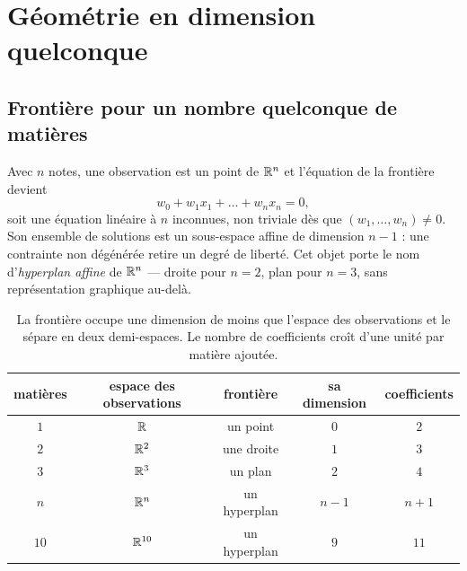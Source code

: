 \chapter{Géométrie en dimension quelconque}
\label{ann:geometrie}


\section{Frontière pour un nombre quelconque de matières}

Avec $n$ notes, une observation est un point de $\mathbb{R}^n$ et l'équation de la
frontière devient
\[
  w_0+w_1x_1+\dots+w_nx_n=0,
\]
soit une équation linéaire à $n$ inconnues, non triviale dès que
$(w_1,\dots,w_n)\neq0$. Son ensemble de solutions est un sous-espace affine de
dimension $n-1$ : une contrainte non dégénérée retire un degré de liberté. Cet
objet porte le nom d'\emph{hyperplan affine} de $\mathbb{R}^n$ --- droite pour $n=2$,
plan pour $n=3$, sans représentation graphique au-delà.

\begin{table}[htbp]
\centering
\begin{tabular}{ccccc}
\toprule
matières & espace des observations & frontière & sa dimension & coefficients \\
\midrule
$1$  & $\mathbb{R}$      & un point    & $0$ & $2$  \\
$2$  & $\mathbb{R}^2$    & une droite  & $1$ & $3$  \\
$3$  & $\mathbb{R}^3$    & un plan     & $2$ & $4$  \\
$n$  & $\mathbb{R}^n$    & un hyperplan & $n-1$ & $n+1$ \\
\midrule
$10$ & $\mathbb{R}^{10}$ & un hyperplan & $9$ & $11$ \\
\bottomrule
\end{tabular}
\caption{La frontière occupe une dimension de moins que l'espace des
observations et le sépare en deux demi-espaces. Le nombre de coefficients croît
d'une unité par matière ajoutée.}
\label{tab:dimensions}
\end{table}

